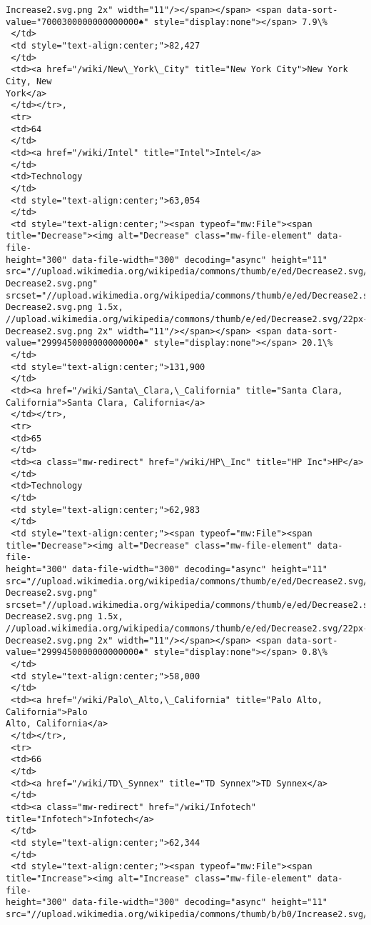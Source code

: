 \documentclass[11pt]{article}
\begin{document}
\begin{tcolorbox}[breakable, size=fbox, boxrule=.5pt, pad at break*=1mm, opacityfill=0]
\begin{Verbatim}[commandchars=\\\{\}]
Increase2.svg.png 2x" width="11"/></span></span> <span data-sort-
value="7000300000000000000♠" style="display:none"></span> 7.9\%
 </td>
 <td style="text-align:center;">82,427
 </td>
 <td><a href="/wiki/New\_York\_City" title="New York City">New York City, New
York</a>
 </td></tr>,
 <tr>
 <td>64
 </td>
 <td><a href="/wiki/Intel" title="Intel">Intel</a>
 </td>
 <td>Technology
 </td>
 <td style="text-align:center;">63,054
 </td>
 <td style="text-align:center;"><span typeof="mw:File"><span
title="Decrease"><img alt="Decrease" class="mw-file-element" data-file-
height="300" data-file-width="300" decoding="async" height="11"
src="//upload.wikimedia.org/wikipedia/commons/thumb/e/ed/Decrease2.svg/11px-
Decrease2.svg.png"
srcset="//upload.wikimedia.org/wikipedia/commons/thumb/e/ed/Decrease2.svg/17px-
Decrease2.svg.png 1.5x,
//upload.wikimedia.org/wikipedia/commons/thumb/e/ed/Decrease2.svg/22px-
Decrease2.svg.png 2x" width="11"/></span></span> <span data-sort-
value="2999450000000000000♠" style="display:none"></span> 20.1\%
 </td>
 <td style="text-align:center;">131,900
 </td>
 <td><a href="/wiki/Santa\_Clara,\_California" title="Santa Clara,
California">Santa Clara, California</a>
 </td></tr>,
 <tr>
 <td>65
 </td>
 <td><a class="mw-redirect" href="/wiki/HP\_Inc" title="HP Inc">HP</a>
 </td>
 <td>Technology
 </td>
 <td style="text-align:center;">62,983
 </td>
 <td style="text-align:center;"><span typeof="mw:File"><span
title="Decrease"><img alt="Decrease" class="mw-file-element" data-file-
height="300" data-file-width="300" decoding="async" height="11"
src="//upload.wikimedia.org/wikipedia/commons/thumb/e/ed/Decrease2.svg/11px-
Decrease2.svg.png"
srcset="//upload.wikimedia.org/wikipedia/commons/thumb/e/ed/Decrease2.svg/17px-
Decrease2.svg.png 1.5x,
//upload.wikimedia.org/wikipedia/commons/thumb/e/ed/Decrease2.svg/22px-
Decrease2.svg.png 2x" width="11"/></span></span> <span data-sort-
value="2999450000000000000♠" style="display:none"></span> 0.8\%
 </td>
 <td style="text-align:center;">58,000
 </td>
 <td><a href="/wiki/Palo\_Alto,\_California" title="Palo Alto, California">Palo
Alto, California</a>
 </td></tr>,
 <tr>
 <td>66
 </td>
 <td><a href="/wiki/TD\_Synnex" title="TD Synnex">TD Synnex</a>
 </td>
 <td><a class="mw-redirect" href="/wiki/Infotech" title="Infotech">Infotech</a>
 </td>
 <td style="text-align:center;">62,344
 </td>
 <td style="text-align:center;"><span typeof="mw:File"><span
title="Increase"><img alt="Increase" class="mw-file-element" data-file-
height="300" data-file-width="300" decoding="async" height="11"
src="//upload.wikimedia.org/wikipedia/commons/thumb/b/b0/Increase2.svg/11px-

\end{Verbatim}
\end{tcolorbox}
\end{document}
